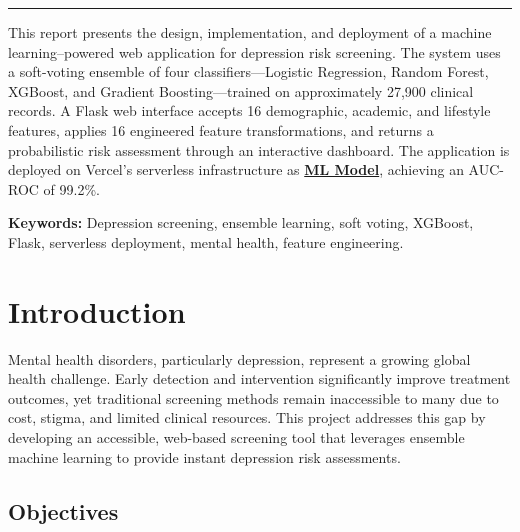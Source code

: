 \documentclass[11pt,a4paper]{article}
\begin{document}
\vspace{0.3em}
{\centering\color{gold}\rule{0.35\textwidth}{0.5pt}\par}
\vspace{1.2em}

\noindent
This report presents the design, implementation, and deployment of a machine learning--powered web application for depression risk screening. The system uses a soft-voting ensemble of four classifiers---Logistic Regression, Random Forest, XGBoost, and Gradient Boosting---trained on approximately 27,900 clinical records. A Flask web interface accepts 16 demographic, academic, and lifestyle features, applies 16 engineered feature transformations, and returns a probabilistic risk assessment through an interactive dashboard. The application is deployed on Vercel's serverless infrastructure as \href{https://studentdepressionmodel.vercel.app}{\textbf{ML Model}}, achieving an AUC-ROC of 99.2\%.

\vspace{1.2em}
\noindent
{\small\textbf{Keywords:} Depression screening, ensemble learning, soft voting, XGBoost, Flask, serverless deployment, mental health, feature engineering.}

\vspace*{\fill}

\newpage
\tableofcontents
\newpage

\listoftables
\newpage

\section{Introduction}

Mental health disorders, particularly depression, represent a growing global health challenge. Early detection and intervention significantly improve treatment outcomes, yet traditional screening methods remain inaccessible to many due to cost, stigma, and limited clinical resources. This project addresses this gap by developing an accessible, web-based screening tool that leverages ensemble machine learning to provide instant depression risk assessments.

\subsection{Objectives}
\end{document}
